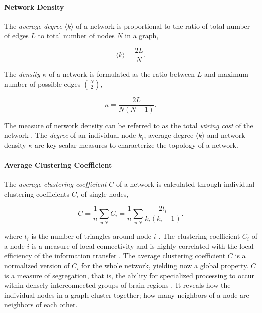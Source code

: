 \documentclass[fleqn,10pt]{wlpeerj}
\begin{document}
\paragraph{Network Density}

The \textit{average degree} $\langle k \rangle$ of a network is proportional to the ratio of total number of edges $L$ to total number of nodes $N$ in a graph, 

\begin{equation}
\langle k \rangle = \frac{2L}{N}.
\end{equation}

The \textit{density} $\kappa$ of a network is formulated as the ratio between $L$ and maximum number of possible edges $\binom{N}{2}$,

\begin{equation}
\kappa = \frac{2L}{N(N-1)}.
\end{equation}	

The measure of network density can be referred to as the total \textit{wiring cost} of the network \citep{RUB10}. The \textit{degree} of an individual node $k_i$, average degree  $\langle k \rangle$ and network density $\kappa$ are key scalar measures to characterize the topology of a network. 

\paragraph{Average Clustering Coefficient}

The \textit{average clustering coefficient} $C$ of a network is calculated through individual clustering coefficients $C_i$ of single nodes,

\begin{equation}
C = \frac{1}{n} \sum\limits_{i\epsilon N}C_i = \frac{1}{n}\sum\limits_{i\epsilon N} \frac{2t_i}{k_i(k_i -1)} .
\end{equation} 

where $t_i$ is the number of triangles around node $i$ \citep{WAT98}. The clustering coefficient $C_i$ of a node $i$ is a measure of local connectivity and is highly correlated with the local efficiency of the information transfer \citep{LAT01}. The average clustering coefficient $C$ is a normalized version of $C_i$ for the whole network, yielding now a global property. $C$ is a measure of segregation, that is, the ability for specialized processing to occur within densely interconnected groups of brain regions \citep{RUB10}. It reveals how the individual nodes in a graph cluster together; how many neighbors of a node are neighbors of each other. 
\end{document}
